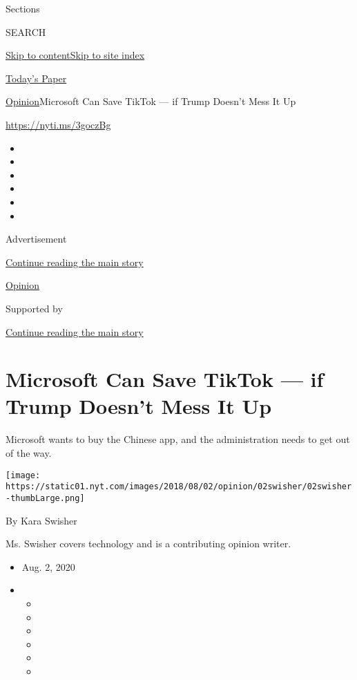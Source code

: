 Sections

SEARCH

\protect\hyperlink{site-content}{Skip to
content}\protect\hyperlink{site-index}{Skip to site index}

\href{https://myaccount.nytimes.com/auth/login?response_type=cookie\&client_id=vi}{}

\href{https://www.nytimes.com/section/todayspaper}{Today's Paper}

\href{/section/opinion}{Opinion}\textbar{}Microsoft Can Save TikTok ---
if Trump Doesn't Mess It Up

\url{https://nyti.ms/3goczBg}

\begin{itemize}
\item
\item
\item
\item
\item
\item
\end{itemize}

Advertisement

\protect\hyperlink{after-top}{Continue reading the main story}

\href{/section/opinion}{Opinion}

Supported by

\protect\hyperlink{after-sponsor}{Continue reading the main story}

\hypertarget{microsoft-can-save-tiktok--if-trump-doesnt-mess-it-up}{%
\section{Microsoft Can Save TikTok --- if Trump Doesn't Mess It
Up}\label{microsoft-can-save-tiktok--if-trump-doesnt-mess-it-up}}

Microsoft wants to buy the Chinese app, and the administration needs to
get out of the way.

\texttt{[image: https://static01.nyt.com/images/2018/08/02/opinion/02swisher/02swisher-thumbLarge.png]}

By Kara Swisher

Ms. Swisher covers technology and is a contributing opinion writer.

\begin{itemize}
\item
  Aug. 2, 2020
\item
  \begin{itemize}
  \item
  \item
  \item
  \item
  \item
  \item
  \end{itemize}
\end{itemize}

